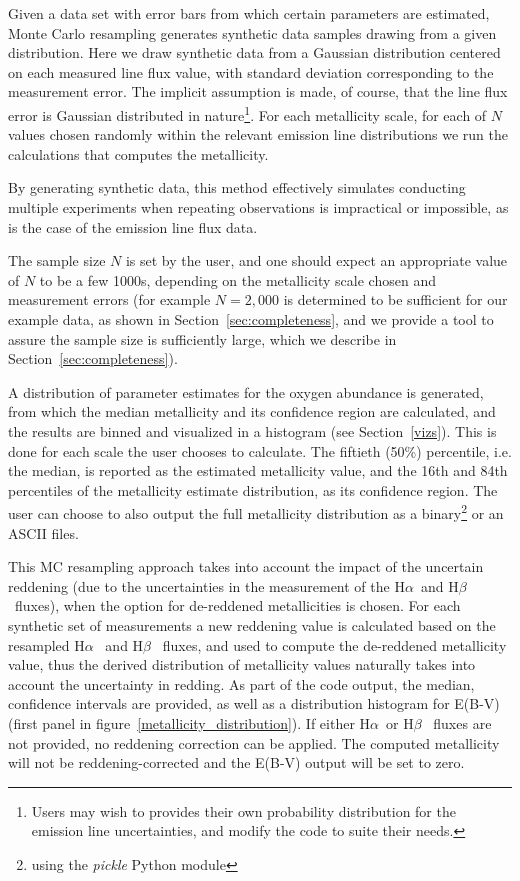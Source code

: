 \documentclass{emulateapj}
\newcommand{\ha}{H$\alpha$}
\newcommand{\hb}{H$\beta$}
\begin{document}
Given a data set with error bars from which certain parameters are estimated, Monte Carlo resampling generates synthetic data samples drawing from a given distribution. 
Here we draw synthetic data from a Gaussian distribution centered on each measured line flux value, with standard deviation corresponding to the measurement error. The implicit assumption is made, of course, that the line flux error is Gaussian distributed in nature\footnote{Users may wish to provides their own probability distribution for the emission line uncertainties, and modify the code to suite their needs.}. 
For each metallicity scale, for each of $N$  values chosen randomly within the relevant emission line distributions we run the calculations that computes the metallicity.

By generating synthetic data, this method effectively simulates conducting multiple experiments when repeating observations is impractical or impossible, as is the case of the emission line flux data.

The sample size $N$ is set by the user, and one should expect an appropriate value of $N$ to be a few 1000s, depending on the metallicity scale chosen and measurement errors (for example  $N=2,000$ is determined to be sufficient for our example data, as shown in Section~\ref{sec:completeness}, and we provide a tool to assure the sample size is sufficiently large, which we describe in Section~\ref{sec:completeness}). 

A distribution of parameter estimates for the oxygen abundance is generated, from which the median metallicity and its confidence region are calculated,
and the results are binned and visualized in a histogram (see Section~\ref{vizs}). This is done for each scale the user chooses to calculate. The fiftieth (50\%) percentile, i.e.  the median, is reported as the estimated metallicity value, and the 16th and 84th percentiles of the metallicity estimate distribution, as its confidence region. The user can choose to also output the full metallicity distribution as a binary\footnote{using the \emph{pickle} Python module} or an ASCII files.

This MC resampling approach takes into account the impact of the uncertain reddening (due to the uncertainties in the measurement of the 
\ha~and \hb~fluxes), when the option for de-reddened metallicities is chosen. For each synthetic set of measurements a new reddening value is calculated based on the resampled \ha~ and \hb~ fluxes, and used to compute the de-reddened metallicity value, thus the derived distribution of metallicity values naturally takes into account the uncertainty in redding. As part of the code output, the median, confidence intervals  are provided, as well as a distribution histogram for E(B-V) (first panel in figure~\ref{metallicity_distribution}). If either \ha~or \hb~ fluxes are not provided, no reddening correction can be applied. The computed metallicity will not be reddening-corrected and the E(B-V) output will be set to zero.
\end{document}

